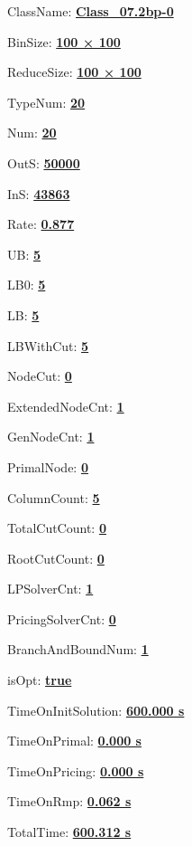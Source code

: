 \documentclass[11pt]{article}
\begin{document}
\pagestyle{empty}


ClassName: \underline{\textbf{Class_07.2bp-0}}
\par
BinSize: \underline{\textbf{100 × 100}}
\par
ReduceSize: \underline{\textbf{100 × 100}}
\par
TypeNum: \underline{\textbf{20}}
\par
Num: \underline{\textbf{20}}
\par
OutS: \underline{\textbf{50000}}
\par
InS: \underline{\textbf{43863}}
\par
Rate: \underline{\textbf{0.877}}
\par
UB: \underline{\textbf{5}}
\par
LB0: \underline{\textbf{5}}
\par
LB: \underline{\textbf{5}}
\par
LBWithCut: \underline{\textbf{5}}
\par
NodeCut: \underline{\textbf{0}}
\par
ExtendedNodeCnt: \underline{\textbf{1}}
\par
GenNodeCnt: \underline{\textbf{1}}
\par
PrimalNode: \underline{\textbf{0}}
\par
ColumnCount: \underline{\textbf{5}}
\par
TotalCutCount: \underline{\textbf{0}}
\par
RootCutCount: \underline{\textbf{0}}
\par
LPSolverCnt: \underline{\textbf{1}}
\par
PricingSolverCnt: \underline{\textbf{0}}
\par
BranchAndBoundNum: \underline{\textbf{1}}
\par
isOpt: \underline{\textbf{true}}
\par
TimeOnInitSolution: \underline{\textbf{600.000 s}}
\par
TimeOnPrimal: \underline{\textbf{0.000 s}}
\par
TimeOnPricing: \underline{\textbf{0.000 s}}
\par
TimeOnRmp: \underline{\textbf{0.062 s}}
\par
TotalTime: \underline{\textbf{600.312 s}}
\par
\newpage


\end{document}
